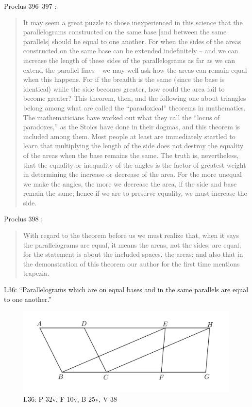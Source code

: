 \documentclass{article}
\begin{document}
Proclus 396--397 \cite[pp.~312--313]{proclus}:

\begin{quote}
It may seem a great puzzle to those inexperienced in this
science that the parallelograms constructed on the same base 
[and between the same parallels] should be equal to one
another. For when the sides of the areas constructed on the
same base can be extended indefinitely -- and we can increase
the length of these sides of the parallelograms as far as we
can extend the parallel lines -- we may well ask how the areas
can remain equal when this happens. For if the breadth is
the same (since the base is identical) while the side becomes
greater, how could the area fail to become greater? This
theorem, then, and the following one about triangles belong
among what are called the ``paradoxical'' theorems in mathematics.
The mathematicians have worked out what they call
the ``locus of paradoxes,'' as the Stoics have done in their
dogmas, and this theorem is included among them. Most
people at least are immediately startled to learn that multiplying
the length of the side does not destroy the equality of
the areas when the base remains the same. The truth is,
nevertheless, that the equality or inequality of the angles
is the factor of greatest weight in determining the increase or
decrease of the area. For the more unequal we make the
angles, the more we decrease the area, if the side and base
remain the same; hence if we are to preserve equality, we
must increase the side.
\end{quote}

Proclus 398 \cite[p.~314]{proclus}:

\begin{quote}
With regard to the theorem before us we must realize that, when it
says the parallelograms are equal, it means the areas, not
the sides, are equal, for the statement is about the included
spaces, the areas; and also that in the demonstration of this
theorem our author for the first time mentions trapezia.
\end{quote}


I.36: ``Parallelograms which are on equal bases and in the same
parallels are equal to one another.''

\begin{figure}
\begin{center}
\includegraphics{I36.png}
\end{center}
\caption{I.36: P 32v, F 10v, B 25v, V 38}
\label{I36}
\end{figure}
\end{document}
